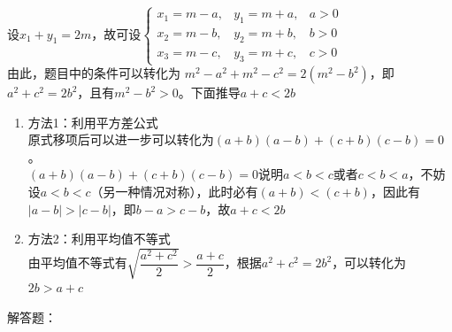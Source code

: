 \begin{enumerate}
    \begin{jieda}
        设$x_1+y_1 = 2m$，故可设$\left \{
\begin{array}{lll}
     x_1 = m - a, & y_1 = m + a, & a > 0\\
     x_2 = m - b, & y_2 = m + b, & b > 0\\
     x_3 = m - c, & y_3 = m + c, & c > 0
\end{array}
\right.$  \\
由此，题目中的条件可以转化为 $m^2 - a^2 + m^2 - c^2 = 2(m^2-b^2)$，即$a^2+c^2 = 2b^2$，且有$m^2 - b^2 > 0$。下面推导$a+c<2b$
\begin{enumerate}
    \item 方法1：利用平方差公式 \\
    原式移项后可以进一步可以转化为$(a+b)(a-b) + (c+b)(c-b) = 0$。\\
    $(a+b)(a-b) + (c+b)(c-b) = 0$说明$a < b < c$或者$c < b < a$，不妨设$a < b < c$（另一种情况对称），此时必有$(a+b) < (c+b)$，因此有$|a-b| > |c-b|$，即$b-a > c-b$，故$a+c<2b$
    \item 方法2：利用平均值不等式 \\
    由平均值不等式有$\sqrt{\dfrac{a^2+c^2}{2}} > \dfrac{a+c}{2}$，根据$a^2+c^2 = 2b^2$，可以转化为$2b > a + c$
\end{enumerate}
    \end{jieda} 
\end{enumerate}
\clearpage
解答题：
